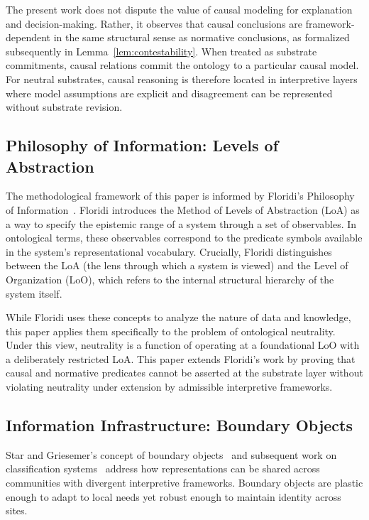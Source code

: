 The present work does not dispute the value of causal modeling
for explanation and decision-making.
Rather, it observes that causal conclusions are framework-dependent
in the same structural sense as normative conclusions,
as formalized subsequently in Lemma~\ref{lem:contestability}.
When treated as substrate commitments,
causal relations commit the ontology to a particular causal model.
For neutral substrates, causal reasoning is therefore located
in interpretive layers where model assumptions are explicit
and disagreement can be represented without substrate revision.

\subsection{Philosophy of Information: Levels of Abstraction}

The methodological framework of this paper is informed by Floridi's
Philosophy of Information~\citep{floridi2008levels,floridi2011philosophy}.
Floridi introduces the Method of Levels of Abstraction (LoA) as a way to
specify the epistemic range of a system through a set of observables.
In ontological terms, these observables correspond to the predicate symbols
available in the system's representational vocabulary.
Crucially, Floridi distinguishes between
the LoA (the lens through which a system is viewed) and
the Level of Organization (LoO), which refers to
the internal structural hierarchy of the system itself.

While Floridi uses these concepts
to analyze the nature of data and knowledge, this paper applies
them specifically to the problem of ontological neutrality.
Under this view, neutrality is a function of
operating at a foundational LoO
with a deliberately restricted LoA.
This paper extends Floridi's work by proving
that causal and normative predicates
cannot be asserted at the substrate layer
without violating neutrality under extension by
admissible interpretive frameworks.

\subsection{Information Infrastructure: Boundary Objects}

Star and Griesemer's concept of
boundary objects~\citep{star1989institutional,star1996ecology}
and subsequent work on classification systems~\citep{bowker1999sorting}
address how representations can be shared across communities
with divergent interpretive frameworks.
Boundary objects are plastic enough to adapt to local needs
yet robust enough to maintain identity across sites.

